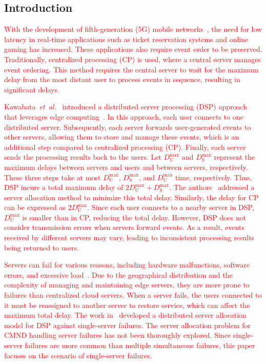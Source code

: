 \documentclass[10pt, letterpaper]{IEEEtran}
\newcommand\red[1]{\textcolor{red}{#1}}
\begin{document}
\begin{CJK}{UTF8}{ipxm}
\section{Introduction}
\label{sec:introduction}

\red{
With the development of fifth-generation (5G) mobile networks~\cite{DOCOMO_5G}, the need for low latency in real-time applications such as ticket reservation systems and online gaming has increased.
These applications also require event order to be preserved.
Traditionally, centralized processing (CP) is used, where a central server manages event ordering.
This method requires the central server to wait for the maximum delay from the most distant user to process events in sequence, resulting in significant delays.
}

\red{
Kawabata~{\it et~al.}~\cite{2Kawabata2017} introduced a distributed server processing (DSP) approach that leverages edge computing~\cite{edge_26,edge_27,edge_28,edge_29}. 
In this approach, each user connects to one distributed server. 
Subsequently, each server forwards user-generated events to other servers, allowing them to store and manage these events, which is an additional step compared to centralized processing (CP). 
Finally, each server sends the processing results back to the users. 
Let $D_\mathrm{U}^{\max}$ and $D_\mathrm{S}^{\max}$ represent the maximum delays between servers and users and between servers, respectively. 
These three steps take at most $D_\mathrm{U}^{\max}$, $D_\mathrm{S}^{\max}$, and $D_\mathrm{U}^{\max}$ time, respectively. 
Thus, DSP incurs a total maximum delay of $2D_\mathrm{U}^{\max} + D_\mathrm{S}^{\max}$. 
The authors~\cite{2Kawabata2017} addressed a server allocation method to minimize this total delay. 
Similarly, the delay for CP can be expressed as $2D_\mathrm{U}^{\max}$. 
Since each user connects to a nearby server in DSP, $D_\mathrm{U}^{\max}$ is smaller than in CP, reducing the total delay. 
However, DSP does not consider transmission errors when servers forward events. 
As a result, events received by different servers may vary, leading to inconsistent processing results being returned to users.
}

\red{
Servers can fail for various reasons, including hardware malfunctions, software errors, and excessive load~\cite{5_9_8_Shi2016}. 
Due to the geographical distribution and the complexity of managing and maintaining edge servers, they are more prone to failures than centralized cloud servers.
When a server fails, the users connected to it must be reassigned to another server to restore service, which can affect the maximum total delay.
The work in~\cite{5_9_Masuda2020} developed a distributed server allocation model for DSP against single-server failures. %
The server allocation problem for CMND handling server failures has not been thoroughly explored.
Since single-server failures are more common than multiple simultaneous failures, this paper focuses on the scenario of single-server failures.
}


\end{CJK}
\end{document}
